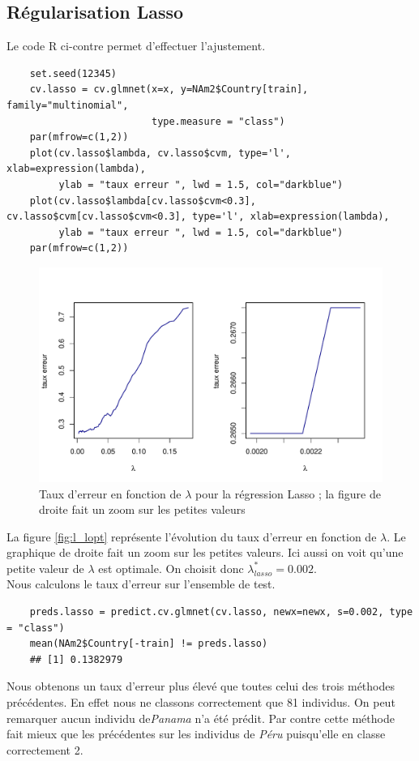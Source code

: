 \documentclass[12pt,a4paper]{article}
\begin{document}
\subsection{Régularisation Lasso}
Le code R ci-contre permet d'effectuer l'ajustement.
\begin{lstlisting}
	set.seed(12345)
	cv.lasso = cv.glmnet(x=x, y=NAm2$Country[train], family="multinomial",
	                     type.measure = "class")
	par(mfrow=c(1,2))
	plot(cv.lasso$lambda, cv.lasso$cvm, type='l', xlab=expression(lambda),
	     ylab = "taux erreur ", lwd = 1.5, col="darkblue")
	plot(cv.lasso$lambda[cv.lasso$cvm<0.3], cv.lasso$cvm[cv.lasso$cvm<0.3], type='l', xlab=expression(lambda),
	     ylab = "taux erreur ", lwd = 1.5, col="darkblue")
	par(mfrow=c(1,2))
\end{lstlisting}
\begin{figure}[h!]
	\begin{center}
		\includegraphics[scale=0.7]{figures/l_opt.pdf}
		\caption{Taux d'erreur en fonction de $\lambda$ pour la régression Lasso ; la figure de  droite fait un zoom sur les petites valeurs}
		\label{fig:l_opt}
	\end{center}
\end{figure}
La figure \ref{fig:l_lopt} représente l'évolution du taux d'erreur en fonction de $\lambda$. Le graphique de droite fait un zoom sur les petites valeurs. Ici aussi on voit qu'une petite valeur de $\lambda$ est optimale. On choisit donc $\lambda_{lasso}^* = 0.002$.\\
Nous calculons le taux d'erreur sur l'ensemble de test.
\begin{lstlisting}
	preds.lasso = predict.cv.glmnet(cv.lasso, newx=newx, s=0.002, type = "class")
	mean(NAm2$Country[-train] != preds.lasso)
	## [1] 0.1382979
\end{lstlisting}
Nous obtenons un taux d'erreur plus élevé que toutes celui des trois méthodes précédentes. En effet nous ne classons correctement que 81 individus. On peut remarquer aucun individu de\textit{Panama} n'a été prédit. Par contre cette méthode fait mieux que les précédentes sur les individus de \textit{Péru} puisqu'elle en classe correctement 2.
\end{document}
